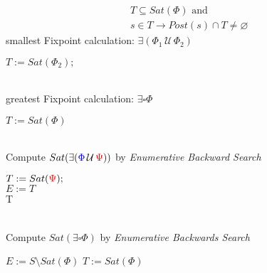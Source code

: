 \documentclass[a4paper, 10pt]{article}
\newcommand{\until}{\,\mathcal{U}\,}
\begin{document}
\begin{mdframed}
\begin{align*}
&T\subseteq Sat(\Phi) \text{ and} \\
&s\in T \longrightarrow Post(s)\cap T\not=\varnothing
\end{align*}
smallest Fixpoint calculation: $\exists(\Phi_1\until\Phi_2)$\\
\begin{algorithm}[H]
$T:=Sat(\Phi_2);$ \\
\end{algorithm}
\ \\
greatest Fixpoint calculation: $\exists\square\Phi$\\
\begin{algorithm}[H]
$T:=Sat(\Phi)$ \\
\end{algorithm}
\ \\ Compute $Sat(\exists(\blue\Phi\until\red\Psi))$ by \emph{Enumerative Backward Search} \\
\begin{algorithm}[H]
$T:=Sat(\textcolor{red}{\Psi});$ \\
$E:=T$\\
\Return T
\end{algorithm}
\ \\ Compute $Sat(\exists\square\Phi)$ by \emph{Enumerative Backwards Search} \\
\begin{algorithm}[H]
$E:=S\setminus Sat(\Phi)$ 
$T:=Sat(\Phi)$ 
\end{algorithm}
\end{mdframed}
\end{document}
